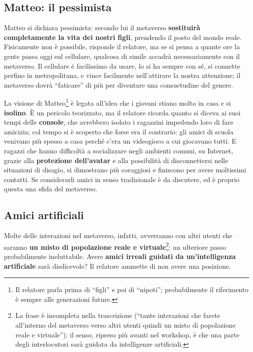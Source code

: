 \subsection{Matteo: il pessimista}

Matteo si dichiara pessimista: secondo lui il metaverso \textbf{sostituirà
completamente la vita dei nostri figli}, prendendo il posto del mondo reale.
Fisicamente non è possibile, risponde il relatore, ma se si pensa a quante ore
la gente passa oggi sul cellulare, qualcosa di simile accadrà necessariamente
con il metaverso. Il cellulare è facilissimo da usare, lo si ha sempre con sé, si
connette perfino in metropolitana, e vince facilmente nell'attirare la nostra
attenzione; il metaverso dovrà ``faticare'' di più per diventare una consuetudine
del genere.

La visione di Matteo\footnote{Il relatore parla prima di ``figli'' e poi di
``nipoti''; probabilmente il riferimento è sempre alle generazioni future.} è
legata all'idea che i giovani stiano molto in casa e si \textbf{isolino}. È un
pericolo teorizzato, ma il relatore ricorda quanto si diceva ai suoi tempi delle
\textbf{console}, che avrebbero isolato i ragazzini impedendo loro di fare
amicizia; col tempo si è scoperto che forse era il contrario: gli amici di
scuola venivano più spesso a casa perché c'era un videogioco a cui giocavano
tutti. E ragazzi che hanno difficoltà a socializzare negli ambienti comuni, su
Internet, grazie alla \textbf{protezione dell'avatar} e alla possibilità di
disconnettersi nelle situazioni di disagio, si dimostrano più coraggiosi e
finiscono per avere moltissimi contatti. Se considerarli amici in senso
tradizionale è da discutere, ed è proprio questa una sfida del metaverso.

\subsection{Amici artificiali}

Molte delle interazioni nel metaverso, infatti, avverranno con altri utenti che
saranno \textbf{un misto di popolazione reale e virtuale}\footnote{La frase è
incompleta nella trascrizione (``tante interazioni che farete all'interno del
metaverso verso altri utenti quindi un misto di popolazione reale e
virtuale''); il senso, ripreso più avanti nel workshop, è che una parte degli
interlocutori sarà guidata da intelligenze artificiali.}: un ulteriore passo
probabilmente ineluttabile. Avere \textbf{amici irreali guidati da
un'intelligenza artificiale} sarà disdicevole? Il relatore ammette di non avere
una posizione.

